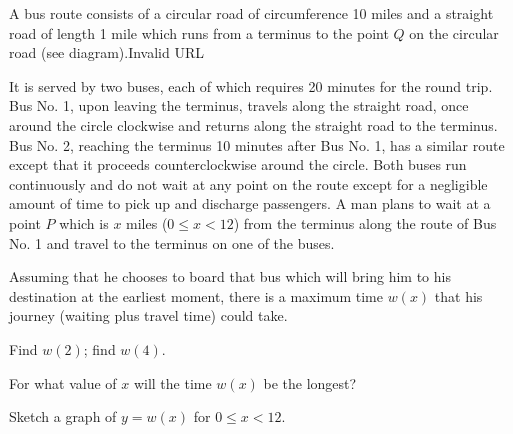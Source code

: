 A bus route consists of a circular road of circumference 10 miles and a straight road of length 1 mile which runs from a terminus to the point $Q$ on the circular road (see diagram).Invalid URL

It is served by two buses, each of which requires 20 minutes for the round trip. Bus No. 1, upon leaving the terminus, travels along the straight road, once around the circle clockwise and returns along the straight road to the terminus. Bus No. 2, reaching the terminus 10 minutes after Bus No. 1, has a similar route except that it proceeds counterclockwise around the circle. Both buses run continuously and do not wait at any point on the route except for a negligible amount of time to pick up and discharge passengers. A man plans to wait at a point $P$ which is $x$ miles ($0\le x < 12$) from the terminus along the route of Bus No. 1 and travel to the terminus on one of the buses.

Assuming that he chooses to board that bus which will bring him to his destination at the earliest moment, there is a maximum time $w(x)$ that his journey (waiting plus travel time) could take.

Find $w(2)$; find $w(4)$.

For what value of $x$ will the time $w(x)$ be the longest?

Sketch a graph of $y = w(x)$ for $0\le x < 12$.